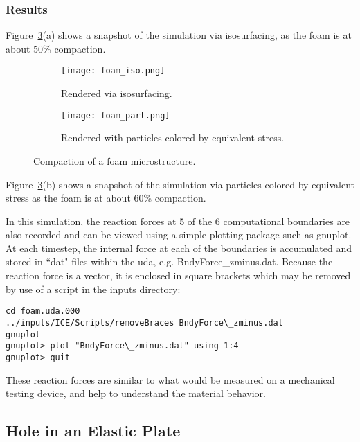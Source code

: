 \subsubsection*{\underline{Results}}

Figure~\ref{figfoam_}(a) shows a snapshot of the simulation via isosurfacing,
as the foam is at about 50\% compaction.
\begin{figure}
  \centering
  \begin{subfigure}{0.4\textwidth}
    \centering
    \texttt{[image: foam\_iso.png]}
    \caption{Rendered via isosurfacing.}
    \label{figfoam}
  \end{subfigure}
  \hspace{12pt}
  \begin{subfigure}{0.4\textwidth}
    \centering
    \texttt{[image: foam\_part.png]}
    \caption{Rendered with particles colored by equivalent stress.}
    \label{figfoampart}
  \end{subfigure}
  \caption{Compaction of a foam microstructure.}
  \label{figfoam_}
\end{figure}

Figure~\ref{figfoam_}(b) shows a snapshot of the simulation via particles
colored by equivalent stress as the foam is at about 60\% compaction.

In this simulation, the reaction forces at 5 of the 6 computational boundaries
are also recorded and can be viewed using a simple plotting package such
as gnuplot.  At each timestep, the internal force at each of the boundaries
is accumulated and stored in ``dat" files within the uda,
e.g. BndyForce\_zminus.dat.  Because the reaction force is a vector, it
is enclosed in square brackets which may be removed by use of a script in
the inputs directory:

\begin{lstlisting}[backgroundcolor=\color{background}]
cd foam.uda.000
../inputs/ICE/Scripts/removeBraces BndyForce\_zminus.dat
gnuplot
gnuplot> plot "BndyForce\_zminus.dat" using 1:4
gnuplot> quit
\end{lstlisting}

These reaction forces are similar to what would be measured on a mechanical
testing device, and help to understand the material behavior.

\newpage
\subsection*{\center Hole in an Elastic Plate}
